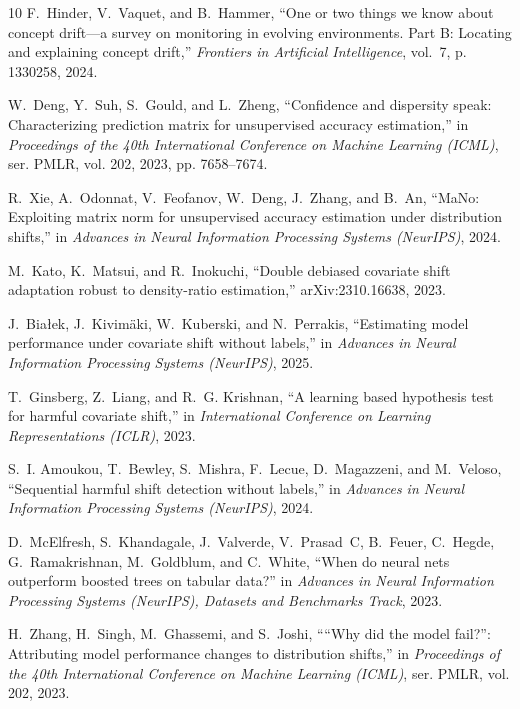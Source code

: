 \documentclass[conference]{IEEEtran}
\theoremstyle{plainhead}
\begin{document}
\begin{thebibliography}{10}
F.~Hinder, V.~Vaquet, and B.~Hammer, ``One or two things we know about concept
  drift---a survey on monitoring in evolving environments. {P}art {B}: Locating
  and explaining concept drift,'' \emph{Frontiers in Artificial Intelligence},
  vol.~7, p. 1330258, 2024.

W.~Deng, Y.~Suh, S.~Gould, and L.~Zheng, ``Confidence and dispersity speak:
  Characterizing prediction matrix for unsupervised accuracy estimation,'' in
  \emph{Proceedings of the 40th International Conference on Machine Learning
  (ICML)}, ser. PMLR, vol. 202, 2023, pp. 7658--7674.

R.~Xie, A.~Odonnat, V.~Feofanov, W.~Deng, J.~Zhang, and B.~An, ``{MaNo}:
  Exploiting matrix norm for unsupervised accuracy estimation under
  distribution shifts,'' in \emph{Advances in Neural Information Processing
  Systems (NeurIPS)}, 2024.

M.~Kato, K.~Matsui, and R.~Inokuchi, ``Double debiased covariate shift
  adaptation robust to density-ratio estimation,'' arXiv:2310.16638, 2023.

J.~Bia{\l}ek, J.~Kivim{\"a}ki, W.~Kuberski, and N.~Perrakis, ``Estimating model
  performance under covariate shift without labels,'' in \emph{Advances in
  Neural Information Processing Systems (NeurIPS)}, 2025.

T.~Ginsberg, Z.~Liang, and R.~G. Krishnan, ``A learning based hypothesis test
  for harmful covariate shift,'' in \emph{International Conference on Learning
  Representations (ICLR)}, 2023.

S.~I. Amoukou, T.~Bewley, S.~Mishra, F.~Lecue, D.~Magazzeni, and M.~Veloso,
  ``Sequential harmful shift detection without labels,'' in \emph{Advances in
  Neural Information Processing Systems (NeurIPS)}, 2024.

D.~McElfresh, S.~Khandagale, J.~Valverde, V.~Prasad~C, B.~Feuer, C.~Hegde,
  G.~Ramakrishnan, M.~Goldblum, and C.~White, ``When do neural nets outperform
  boosted trees on tabular data?'' in \emph{Advances in Neural Information
  Processing Systems (NeurIPS), Datasets and Benchmarks Track}, 2023.

H.~Zhang, H.~Singh, M.~Ghassemi, and S.~Joshi, ````{W}hy did the model fail?'':
  Attributing model performance changes to distribution shifts,'' in
  \emph{Proceedings of the 40th International Conference on Machine Learning
  (ICML)}, ser. PMLR, vol. 202, 2023.


\end{thebibliography}
\end{document}
